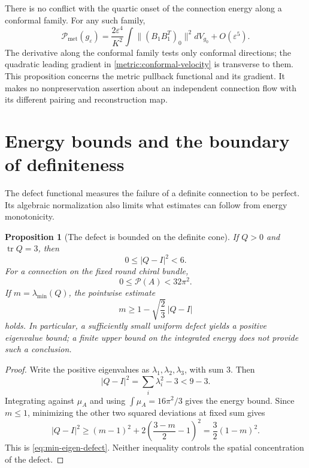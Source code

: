 \documentclass[11pt]{article}
\numberwithin{equation}{section}
\newtheorem{proposition}[theorem]{Proposition}
\theoremstyle{definition}
\theoremstyle{remark}
\begin{document}
There is no conflict with the quartic onset of the connection energy
along a conformal family. For any such family,
\begin{equation}\label{metric:conformal-quartic-energy}
 \mathcal P_{\mathrm{met}}(g_\varepsilon)
 =\frac{2\varepsilon^4}{K^2}\int\|(B_1B_1^T)_0\|^2dV_{g_0}
 +O(\varepsilon^5).
\end{equation}
The derivative along the conformal family tests only conformal
directions; the quadratic leading gradient in
\eqref{metric:conformal-velocity} is transverse to them. This proposition
concerns the metric pullback functional and its gradient. It makes no
nonpreservation assertion about an independent connection flow with its
different pairing and reconstruction map.


\section{Energy bounds and the boundary of definiteness}\label{sec:boundary}

The defect functional measures the failure of a definite connection to be perfect. Its algebraic normalization also limits what estimates can follow from energy monotonicity.

\begin{proposition}[The defect is bounded on the definite cone]\label{prop:bounded-defect}
If \(Q>0\) and \(\operatorname{tr}Q=3\), then
\[
0\leq |Q-I|^2<6.
\]
For a connection on the fixed round chiral bundle,
\[
0\leq\mathcal P(A)<32\pi^2.
\]
If \(m=\lambda_{\min}(Q)\), the pointwise estimate
\begin{equation}\label{eq:min-eigen-defect}
m\geq1-\sqrt{\frac23}\,|Q-I|
\end{equation}
holds. In particular, a sufficiently small \emph{uniform} defect yields a positive eigenvalue bound; a finite upper bound on the integrated energy does not provide such a conclusion.
\end{proposition}
\begin{proof}
Write the positive eigenvalues as \(\lambda_1,\lambda_2,\lambda_3\), with sum \(3\). Then
\[
|Q-I|^2=\sum_i\lambda_i^2-3<9-3.
\]
Integrating against \(\mu_A\) and using
\(\int\mu_A=16\pi^2/3\) gives the energy bound. Since \(m\leq1\), minimizing the other two squared deviations at fixed sum gives
\[
|Q-I|^2\geq(m-1)^2+
2\left(\frac{3-m}{2}-1\right)^2
=\frac32(1-m)^2.
\]
This is \eqref{eq:min-eigen-defect}. Neither inequality controls the spatial concentration of the defect.
\end{proof}
\end{document}
